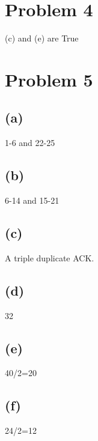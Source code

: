 \documentclass[11pt]{article}
\begin{document}
%




\newpage

\section*{Problem 4}
(c) and (e) are True
\label{pg:end-of-p4}

%


\newpage

\section*{Problem 5}
\subsection*{(a)}
1-6 and 22-25
\subsection*{(b)}
6-14 and 15-21
\subsection*{(c)}
A triple duplicate ACK.
\subsection*{(d)}
32
\subsection*{(e)}
40/2=20
\subsection*{(f)}
24/2=12
\end{document}
